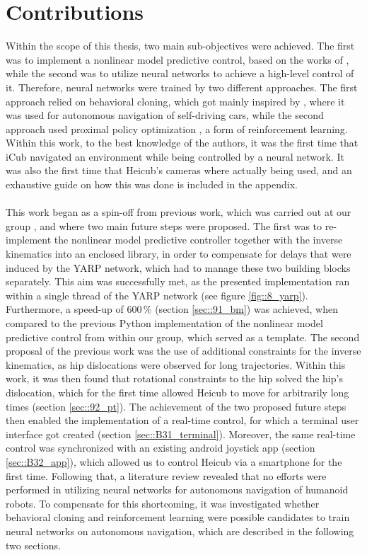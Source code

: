 \label{sec::12_co}
\FloatBarrier
\section{Contributions}
Within the scope of this thesis, two main sub-objectives were achieved. The first was to implement a nonlinear model predictive control, based on the works of \cite{stein2017closed}\cite{naveau2016reactive}, while the second was to utilize neural networks to achieve a high-level control of it. Therefore, neural networks were trained by two different approaches. The first approach relied on behavioral cloning, which got mainly inspired by \cite{bojarski2016end}, where it was used for autonomous navigation of self-driving cars, while the second approach used proximal policy optimization \cite{schulman2017proximal}, a form of reinforcement learning.  Within this work, to the best knowledge of the authors, it was the first time that iCub navigated an environment while being controlled by a neural network. It was also the first time that Heicub's cameras where actually being used, and an exhaustive guide on how this was done is included in the appendix.\\\\
This work began as a spin-off from previous work, which was carried out at our group \cite{stein2017closed}, and where two main future steps were proposed. The first was to re-implement the nonlinear model predictive controller together with the inverse kinematics into an enclosed library, in order to compensate for delays that were induced by the YARP network, which had to manage these two building blocks separately. This aim was successfully met, as the presented implementation ran within a single thread of the YARP network (see figure \ref{fig::8_yarp}). Furthermore, a speed-up of $600\,\%$ (section \ref{sec::91_bm}) was achieved, when compared to the previous Python implementation of the nonlinear model predictive control from within our group, which served as a template. The second proposal of the previous work was the use of additional constraints for the inverse kinematics, as hip dislocations were observed for long trajectories. Within this work, it was then found that rotational constraints to the hip solved the hip's dislocation, which for the first time allowed Heicub to move for arbitrarily long times (section \ref{sec::92_pt}). The achievement of the two proposed future steps then enabled the implementation of a real-time control, for which a terminal user interface got created (section \ref{sec::B31_terminal}). Moreover, the same real-time control was synchronized with an existing android joystick app (section \ref{sec::B32_app}), which allowed us to control Heicub via a smartphone for the first time. Following that, a literature review revealed that no efforts were performed in utilizing neural networks for autonomous navigation of humanoid robots. To compensate for this shortcoming, it was investigated whether behavioral cloning and reinforcement learning were possible candidates to train neural networks on autonomous navigation, which are described in the following two sections.\\\\
